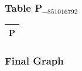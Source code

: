 \documentclass{beamer}
\begin{document}
\begin{frame}
\frametitle{Table P$_{-851016792}$}
\begin{center}
    \begin{tabular}{|c||}
        \hline
        \textbf{P} \\
        \hline
        \hline
    \end{tabular}
\end{center}


\end{frame}\begin{frame}
\frametitle{Final Graph}
\begin{center}
\begin{tikzpicture}
\end{tikzpicture}
\end{center}
\end{frame}
\end{document}
